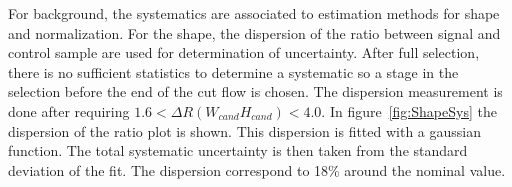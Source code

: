 \begin{table*}[htbH]
\begin{center}
\end{center}
\caption{Summary of uncertainties for signal samples\label{tab:sys}}
\end{table*}

For background, the systematics are associated to estimation methods for shape and normalization. For the shape, the dispersion of the ratio between signal and control sample are used for determination of uncertainty. After full selection, there is no sufficient statistics to determine a systematic so a stage in the selection before the end of the cut flow is chosen. The dispersion measurement is done after requiring $1.6 < \Delta R (W_{cand} H_{cand}) < 4.0$. In figure~\ref{fig:ShapeSys} the dispersion of the ratio plot is shown. This dispersion is fitted with a gaussian function. The total systematic uncertainty is then taken from the standard deviation of the fit. The dispersion correspond to 18\% around the nominal value.

